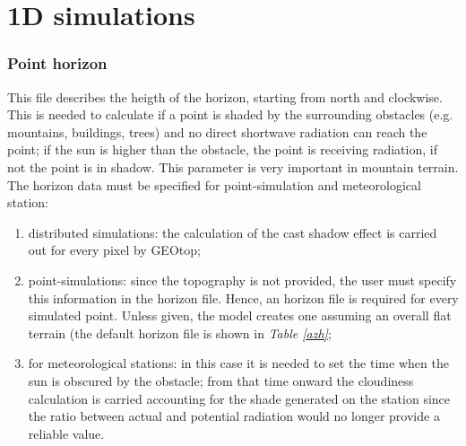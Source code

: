\chapter{1D simulations}\label{}


\subsection{Point horizon}
This file describes the heigth of the horizon, starting from north and
clockwise. 
This is needed to calculate if a point is shaded by the surrounding obstacles 
(e.g. mountains, buildings, trees)
and no direct shortwave radiation can reach the point; if the sun is higher 
than the obstacle, the point is receiving radiation, if not the point is in shadow. 
This parameter is very important in
mountain terrain.\\



The horizon data must be specified for point-simulation and meteorological station:
\begin{enumerate}
 \item distributed simulations: the calculation of the cast shadow effect is carried out for 
every pixel by GEOtop;
 \item point-simulations: since the topography is not provided, the user must specify this 
information in the horizon file. Hence, an horizon file is required for every simulated point. 
Unless given, the model creates one assuming an overall flat terrain (the default horizon file is 
shown in \textsl{Table \ref{azh}};
 \item for meteorological stations: in this case it is needed to set the time when the sun 
is obscured by the obstacle; from that time onward the cloudiness calculation is carried 
accounting for the shade generated 
on the station since the ratio between actual and potential radiation would no longer
provide a reliable value.
\end{enumerate}

